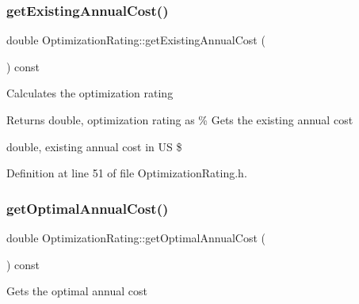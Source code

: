 \mbox{\label{class_optimization_rating_ac6e84aa94642911d089e464aae749ffe}} 
\subsubsection{\texorpdfstring{get\+Existing\+Annual\+Cost()}{getExistingAnnualCost()}\hspace{0.1cm}{\footnotesize\ttfamily [3/3]}}
{\footnotesize\ttfamily double Optimization\+Rating\+::get\+Existing\+Annual\+Cost (\begin{DoxyParamCaption}{ }\end{DoxyParamCaption}) const\hspace{0.3cm}{\ttfamily [inline]}}

Calculates the optimization rating

\begin{DoxyReturn}{Returns}
double, optimization rating as \% Gets the existing annual cost

double, existing annual cost in US \$ 
\end{DoxyReturn}


Definition at line 51 of file Optimization\+Rating.\+h.

\mbox{\label{class_optimization_rating_ada9718f5369be2b14b4b0c07d4fa9510}} 
\subsubsection{\texorpdfstring{get\+Optimal\+Annual\+Cost()}{getOptimalAnnualCost()}\hspace{0.1cm}{\footnotesize\ttfamily [1/3]}}
{\footnotesize\ttfamily double Optimization\+Rating\+::get\+Optimal\+Annual\+Cost (\begin{DoxyParamCaption}{ }\end{DoxyParamCaption}) const\hspace{0.3cm}{\ttfamily [inline]}}

Gets the optimal annual cost

